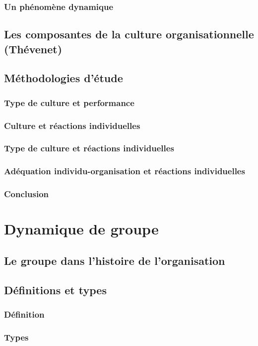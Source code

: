\documentclass[12pt]{article}
\begin{document}
		\subsubsection{Un phénomène dynamique}
	\subsection{Les composantes de la culture organisationnelle (Thévenet)}
	\subsection{Méthodologies d'étude}
		\subsubsection{Type de culture et performance}
		\subsubsection{Culture et réactions individuelles}
		\subsubsection{Type de culture et réactions individuelles}
		\subsubsection{Adéquation individu-organisation et réactions individuelles}
		\subsubsection{Conclusion}
		
\section{Dynamique de groupe}
	\subsection{Le groupe dans l’histoire de l’organisation}
	\subsection{Définitions et types}
		\subsubsection{Définition}
		\subsubsection{Types}
\end{document}
